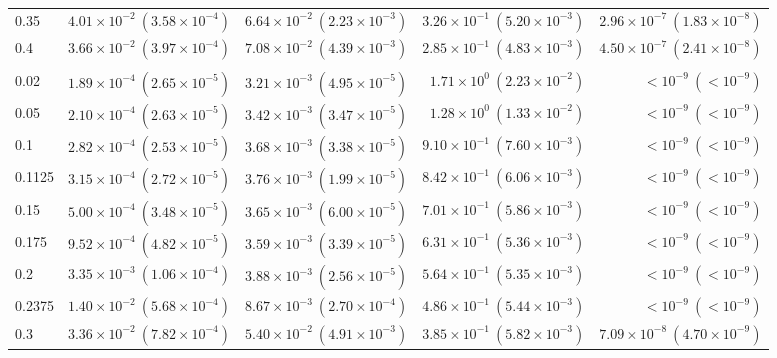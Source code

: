 \begin{table}[htbp]
\begin{tabular}{@{} l rrrr @{}}
0.35 & $4.01\!\times\!10^{-2}\ (3.58\!\times\!10^{-4})$ & $6.64\!\times\!10^{-2}\ (2.23\!\times\!10^{-3})$ & $3.26\!\times\!10^{-1}\ (5.20\!\times\!10^{-3})$ & $2.96\!\times\!10^{-7}\ (1.83\!\times\!10^{-8})$ \\
0.4 & $3.66\!\times\!10^{-2}\ (3.97\!\times\!10^{-4})$ & $7.08\!\times\!10^{-2}\ (4.39\!\times\!10^{-3})$ & $2.85\!\times\!10^{-1}\ (4.83\!\times\!10^{-3})$ & $4.50\!\times\!10^{-7}\ (2.41\!\times\!10^{-8})$ \\
\addlinespace
\multicolumn{5}{@{}l}{\textit{Medium ($p \sim \mathcal{U}(0.1125, 0.2375)$)}} \\
0.02 & $1.89\!\times\!10^{-4}\ (2.65\!\times\!10^{-5})$ & $3.21\!\times\!10^{-3}\ (4.95\!\times\!10^{-5})$ & $1.71\!\times\!10^{0}\ (2.23\!\times\!10^{-2})$ & $<\!10^{-9}\ (<\!10^{-9})$ \\
0.05 & $2.10\!\times\!10^{-4}\ (2.63\!\times\!10^{-5})$ & $3.42\!\times\!10^{-3}\ (3.47\!\times\!10^{-5})$ & $1.28\!\times\!10^{0}\ (1.33\!\times\!10^{-2})$ & $<\!10^{-9}\ (<\!10^{-9})$ \\
0.1 & $2.82\!\times\!10^{-4}\ (2.53\!\times\!10^{-5})$ & $3.68\!\times\!10^{-3}\ (3.38\!\times\!10^{-5})$ & $9.10\!\times\!10^{-1}\ (7.60\!\times\!10^{-3})$ & $<\!10^{-9}\ (<\!10^{-9})$ \\
0.1125 & $3.15\!\times\!10^{-4}\ (2.72\!\times\!10^{-5})$ & $3.76\!\times\!10^{-3}\ (1.99\!\times\!10^{-5})$ & $8.42\!\times\!10^{-1}\ (6.06\!\times\!10^{-3})$ & $<\!10^{-9}\ (<\!10^{-9})$ \\
0.15 & $5.00\!\times\!10^{-4}\ (3.48\!\times\!10^{-5})$ & $3.65\!\times\!10^{-3}\ (6.00\!\times\!10^{-5})$ & $7.01\!\times\!10^{-1}\ (5.86\!\times\!10^{-3})$ & $<\!10^{-9}\ (<\!10^{-9})$ \\
0.175 & $9.52\!\times\!10^{-4}\ (4.82\!\times\!10^{-5})$ & $3.59\!\times\!10^{-3}\ (3.39\!\times\!10^{-5})$ & $6.31\!\times\!10^{-1}\ (5.36\!\times\!10^{-3})$ & $<\!10^{-9}\ (<\!10^{-9})$ \\
0.2 & $3.35\!\times\!10^{-3}\ (1.06\!\times\!10^{-4})$ & $3.88\!\times\!10^{-3}\ (2.56\!\times\!10^{-5})$ & $5.64\!\times\!10^{-1}\ (5.35\!\times\!10^{-3})$ & $<\!10^{-9}\ (<\!10^{-9})$ \\
0.2375 & $1.40\!\times\!10^{-2}\ (5.68\!\times\!10^{-4})$ & $8.67\!\times\!10^{-3}\ (2.70\!\times\!10^{-4})$ & $4.86\!\times\!10^{-1}\ (5.44\!\times\!10^{-3})$ & $<\!10^{-9}\ (<\!10^{-9})$ \\
0.3 & $3.36\!\times\!10^{-2}\ (7.82\!\times\!10^{-4})$ & $5.40\!\times\!10^{-2}\ (4.91\!\times\!10^{-3})$ & $3.85\!\times\!10^{-1}\ (5.82\!\times\!10^{-3})$ & $7.09\!\times\!10^{-8}\ (4.70\!\times\!10^{-9})$ \\

\end{tabular}
\end{table}
